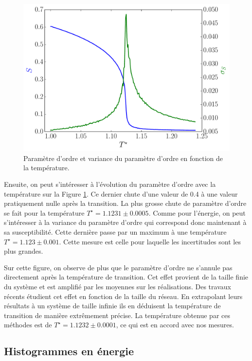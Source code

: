 \documentclass[11pt,a4paper]{article}
\numberwithin{equation}{section}
\begin{document}
\begin{figure}[h!]
    \centering	    
	\includegraphics[scale=0.6]{figures/local_order.pdf}
    \caption{Paramètre d'ordre et variance du paramètre d'ordre en fonction de la température.}
    	\label{local_order} 
\end{figure}

Ensuite, on peut s'intéresser à l'évolution du paramètre d'ordre avec la température sur la Figure \ref{local_order}. Ce dernier chute d'une valeur de 0.4 à une valeur pratiquement nulle après la transition. La plus grosse chute de paramètre d'ordre se fait pour la température $T^\star = 1.1231 \pm 0.0005$. Comme pour l'énergie, on peut s'intéresser à la variance du paramètre d'ordre qui correspond donc maintenant à sa susceptibilité. Cette dernière passe par un maximum à une température $T^\star = 1.123 \pm 0.001$. Cette mesure est celle pour laquelle les incertitudes sont les plus grandes.
\medskip

Sur cette figure, on observe de plus que le paramètre d'ordre ne s'annule pas directement après la température de transition. Cet effet provient de la taille finie du système et est amplifié par les moyennes sur les réalisations. Des travaux récents \cite{cluster,nonb} étudient cet effet en fonction de la taille du réseau. En extrapolant leurs résultats à un système de taille infinie ils en déduisent la température de transition de manière extrêmement précise. La température obtenue par ces méthodes est de $T^\star = 1.1232 \pm 0.0001$, ce qui est en accord avec nos mesures.

\newpage

\subsection{Histogrammes en énergie}
\end{document}
